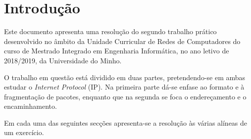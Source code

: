 
\section*{Introdução}

Este documento apresenta uma resolução do segundo trabalho prático desenvolvido
no âmbito da Unidade Curricular de Redes de Computadores do curso de Mestrado
Integrado em Engenharia Informática, no ano letivo de 2018/2019, da Universidade
do Minho.

O trabalho em questão está dividido em duas partes, pretendendo-se em ambas
estudar o \emph{Internet Protocol} (IP). Na primeira parte dá-se enfase ao
formato e à fragmentação de pacotes, enquanto que na segunda se foca o
endereçamento e o encaminhamento.

Em cada uma das seguintes secções apresenta-se a resolução às várias alíneas de
um exercício. %

